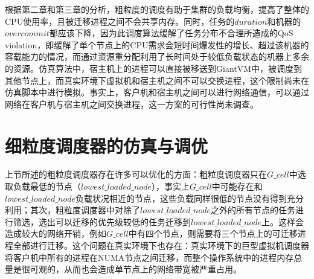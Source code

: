 根据第二章和第三章的分析，粗粒度的调度有助于集群的负载均衡，提高了整体的CPU使用率，且被迁移进程之间不会共享内存。同时，任务的$duration$和机器的$overcommit$都应该下降，因为此调度算法缓解了任务分布不合理所造成的QoS violation，即缓解了单个节点上的CPU需求会短时间爆发性的增长、超过该机器的容载能力的情况，而通过资源重分配利用了长时间处于较低负载状态的机器上多余的资源。仿真算法中，宿主机上的进程可以直接被移送到GiantVM中，被调度到其他节点上，而真实环境下虚拟机和宿主机之间不可以交换进程，这个限制尚未在仿真脚本中进行模拟。事实上，客户机和宿主机之间可以进行网络通信，可以通过网络在客户机与宿主机之间交换进程，这一方案的可行性尚未调查。

\section{细粒度调度器的仿真与调优}
上节所述的粗粒度调度器存在许多可以优化的方面：粗粒度调度器只在$G\_cell$中选取负载最低的节点（$lowest\_loaded\_node$），事实上$G\_cell$中可能存在和$lowest\_loaded\_node$负载状况相近的节点，这些负载同样很低的节点没有得到充分利用；其次，粗粒度调度器中对除了$lowest\_loaded\_node$之外的所有节点的任务进行筛选，选出可以迁移的优先级较低的任务迁移到$lowest\_loaded\_node$上。这样会造成较大的网络开销，例如$G\_cell$中有四个节点，则需要将三个节点上的可迁移进程全部进行迁移。这个问题在真实环境下也存在：真实环境下的巨型虚拟机调度器将客户机中所有的进程在NUMA节点之间迁移，而整个操作系统中的进程内存总量是很可观的，从而也会造成单节点上的网络带宽被严重占用。

